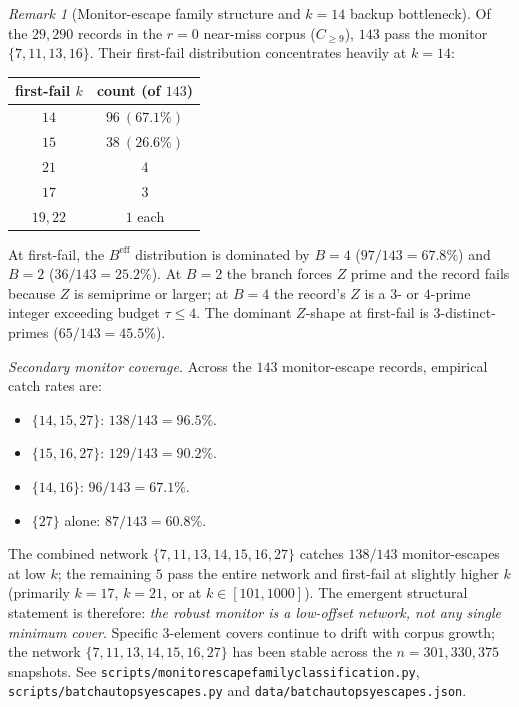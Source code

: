 \documentclass[11pt]{article}
\renewcommand{\_}{\origunderscore\allowbreak}
\theoremstyle{definition}
\theoremstyle{remark}
\newtheorem{remark}[theorem]{Remark}
\begin{document}
\begin{remark}[Monitor-escape family structure and $k=14$ backup bottleneck]\label{rem:monitor_escape_family}
Of the $29{,}290$ records in the $r=0$ near-miss corpus
($C_{\ge 9}$), $143$ pass the monitor $\{7,11,13,16\}$.  Their
first-fail distribution concentrates heavily at $k=14$:

\begin{center}
\begin{tabular}{c|c}
\hline
first-fail $k$ & count (of $143$) \\
\hline
$14$ & $96\ (67.1\%)$ \\
$15$ & $38\ (26.6\%)$ \\
$21$ & $4$ \\
$17$ & $3$ \\
$19, 22$ & $1$ each \\
\hline
\end{tabular}
\end{center}

\noindent At first-fail, the $B^{\mathrm{eff}}$ distribution is
dominated by $B=4$ ($97/143 = 67.8\%$) and $B=2$ ($36/143 = 25.2\%$).
At $B=2$ the branch forces $Z$ prime and the record fails because
$Z$ is semiprime or larger; at $B=4$ the record's $Z$ is a
$3$- or $4$-prime integer exceeding budget $\tau\le 4$.  The
dominant $Z$-shape at first-fail is $3$-distinct-primes
($65/143 = 45.5\%$).

\emph{Secondary monitor coverage.}  Across the $143$ monitor-escape
records, empirical catch rates are:
\begin{itemize}
\item $\{14, 15, 27\}$: $138/143 = 96.5\%$.
\item $\{15, 16, 27\}$: $129/143 = 90.2\%$.
\item $\{14, 16\}$: $96/143 = 67.1\%$.
\item $\{27\}$ alone: $87/143 = 60.8\%$.
\end{itemize}

\noindent The combined network $\{7,11,13,14,15,16,27\}$ catches
$138/143$ monitor-escapes at low $k$; the remaining $5$ pass the
entire network and first-fail at slightly higher $k$ (primarily
$k=17$, $k=21$, or at $k\in[101, 1000]$).  The emergent structural
statement is therefore:
\emph{the robust monitor is a low-offset network, not any single
minimum cover}.  Specific $3$-element covers continue to drift with
corpus growth; the network $\{7,11,13,14,15,16,27\}$ has been stable
across the $n=301,330,375$ snapshots.  See
\texttt{scripts/monitor\_escape\_family\_classification.py},
\texttt{scripts/batch\_autopsy\_143\_escapes.py} and
\texttt{data/batch\_autopsy\_143\_escapes.json}.
\end{remark}
\end{document}
